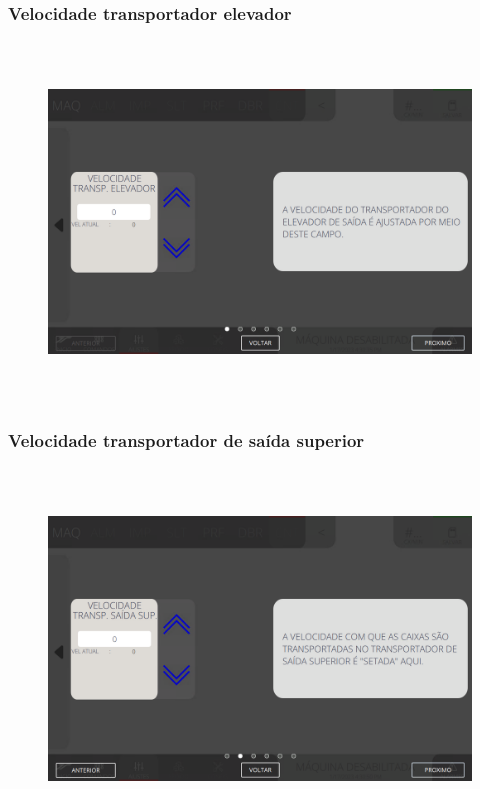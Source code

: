 \newpage
\thispagestyle{fancy}
\vspace*{\fill}
\subsubsection{\small{Velocidade transportador elevador}}
\begin{figure}[h]
  \centering
  \includegraphics[width=576px,height=360px]{src/imagesFlexo/08-count/settings/e-7.png}
\end{figure}
\vspace*{\fill}


\newpage
\thispagestyle{fancy}
\vspace*{\fill}
\subsubsection{\small{Velocidade transportador de saída superior}}
\begin{figure}[h]
  \centering
  \includegraphics[width=576px,height=360px]{src/imagesFlexo/08-count/settings/e-8.png}
\end{figure}
\vspace*{\fill}


